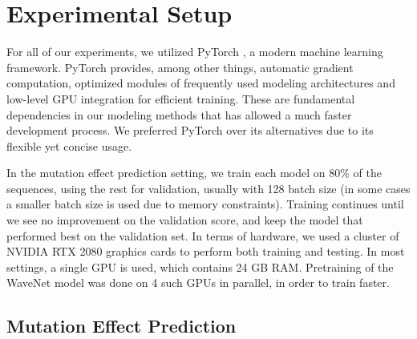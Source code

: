 
\section{Experimental Setup}
\label{sec:experimental_setup}
For all of our experiments, we utilized PyTorch \cite{NEURIPS2019_9015}, a modern machine learning framework. PyTorch provides, among other things, automatic gradient computation, optimized modules of frequently used modeling architectures and low-level GPU integration for efficient training. These are fundamental dependencies in our modeling methods that has allowed a much faster development process. We preferred PyTorch over its alternatives due to its flexible yet concise usage.

In the mutation effect prediction setting, we train each model on 80\% of the sequences, using the rest for validation, usually with 128 batch size (in some cases a smaller batch size is used due to memory constraints). Training continues until we see no improvement on the validation score, and keep the model that performed best on the validation set. In terms of hardware, we used a cluster of NVIDIA RTX 2080 graphics cards to perform both training and testing. In most settings, a single GPU is used, which contains 24 GB RAM. Pretraining of the WaveNet model was done on 4 such GPUs in parallel, in order to train faster.

\subsection{Mutation Effect Prediction}
\label{sec:mutation_effect_prediction}


